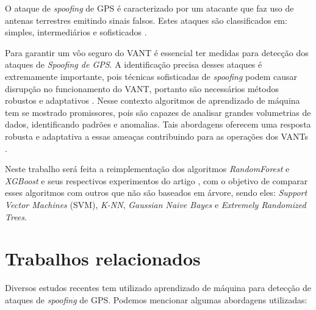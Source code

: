 \documentclass[12pt]{article}
\begin{document}
O ataque de \textit{spoofing} de GPS
é caracterizado por um atacante que faz uso de antenas terrestres
emitindo sinais falsos. \cite{Spoofing}
Estes ataques são classificados em: simples,
intermediários e sofisticados \cite{Aissou2021}.

Para garantir um vôo seguro do VANT é essencial ter medidas
para detecção dos ataques de \textit{Spoofing de GPS}.
A identificação precisa desses ataques é extremamente importante,
pois técnicas sofisticadas de \textit{spoofing}
podem causar disrupção no funcionamento do VANT,
portanto são necessários métodos robustos e adaptativos
\cite{isleyenGPSSpoofingDetection2024}.
Nesse contexto algoritmos de aprendizado
de máquina tem se mostrado promissores,
pois são capazes de analisar grandes volumetrias de dados,
identificando padrões e anomalias.
Tais abordagens oferecem uma resposta robusta e adaptativa
a essas ameaças contribuindo para as operações dos VANTs
\cite{isleyenGPSSpoofingDetection2024}.



Neste trabalho será feita a reimplementação dos algoritmos
\textit{RandomForest} e \textit{XGBoost} e seus respectivos 
experimentos do artigo \cite{Aissou2021}, com o objetivo de comparar
esses algoritmos com outros que não são baseados em árvore,
sendo eles: \textit{Support Vector Machines} (SVM), \textit{K-NN},
\textit{Gaussian Naive Bayes} e \textit{Extremely Randomized Trees}.

\section{Trabalhos relacionados}

Diversos estudos recentes tem utilizado aprendizado de máquina
para detecção de ataques de \textit{spoofing} de GPS.
Podemos mencionar algumas abordagens utilizadas:
\end{document}
